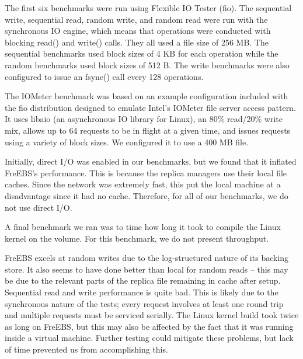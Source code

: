 The first six benchmarks were run using Flexible IO Tester (fio). The sequential write, sequential read, random write, and random read were run with the synchronous IO engine, which means that operations were conducted with blocking read() and write() calls. They all used a file size of 256 MB. The sequential benchmarks used block sizes of 4 KB for each operation while the random benchmarks used block sizes of 512 B. The write benchmarks were also configured to issue an fsync() call every 128 operations.

The IOMeter benchmark was based on an example configuration included with the fio distribution designed to emulate Intel's IOMeter file server access pattern. It uses libaio (an asynchronous IO library for Linux), an 80\% read/20\% write mix, allows up to 64 requests to be in flight at a given time, and issues requests using a variety of block sizes. We configured it to use a 400 MB file.

Initially, direct I/O was enabled in our benchmarks, but we found that it inflated FreEBS's performance. This is because the replica managers use their local file caches. Since the network was extremely fast, this put the local machine at a disadvantage since it had no cache. Therefore, for all of our benchmarks, we do not use direct I/O.

A final benchmark we ran was to time how long it took to compile the Linux kernel on the volume. For this benchmark, we do not present throughput.

FreEBS excels at random writes due to the log-structured nature of its backing store. It also seems to have done better than local for random reads -- this may be due to the relevant parts of the replica file remaining in cache after setup. Sequential read and write performance is quite bad. This is likely due to the synchronous nature of the tests; every request involves at least one round trip and multiple requests must be serviced serially. The Linux kernel build took twice as long on FreEBS, but this may also be affected by the fact that it was running inside a virtual machine. Further testing could mitigate these problems, but lack of time prevented us from accomplishing this.